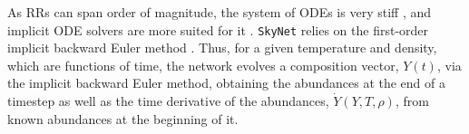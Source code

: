 %
As \acp{RR} can span order of magnitude, 
the system of \acp{ODE} is very stiff \citep{Timmes:1999,Hix:2005pf}, and implicit \ac{ODE} solvers 
are more suited for it \citep{Timmes:1999,Winteler:2012,Longland:2014}.
\texttt{SkyNet} relies on the first-order implicit backward Euler method \citep{Hix:1999}. %
%
Thus, for a given temperature and density, which are functions of time, 
the network evolves a composition vector, $Y(t)$, via the implicit 
backward Euler method, obtaining the abundances at the end of a timestep 
as well as the time derivative of the abundances, $\dot{Y}(Y,T,\rho)$,  
from known abundances at the beginning of it. 
%

